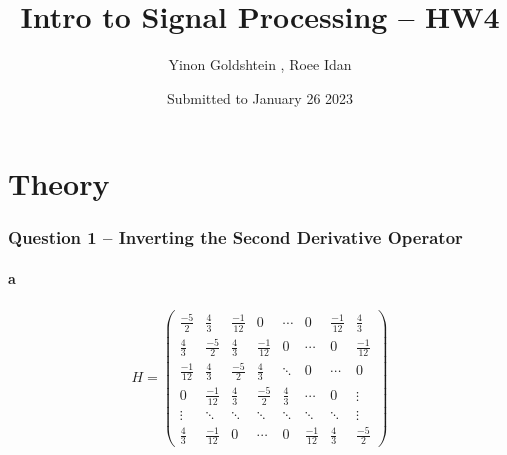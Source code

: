 \documentclass[a4paper]{article}
\begin{document}
\title{Intro to Signal Processing -- HW4}
\author{Yinon Goldshtein , Roee Idan}
\date{Submitted to January 26 2023}
\maketitle

\part{Theory}

\section*{Question 1 -- Inverting the Second Derivative Operator}



\subsection*{a}
\begin{align}
        H = \begin{pmatrix} \frac{-5}{2} & \frac{4}{3} & \frac{-1}{12} & 0 &\cdots & 0 & \frac{-1}{12} & \frac{4}{3}\\ \frac{4}{3} & \frac{-5}{2} & \frac{4}{3} & \frac{-1}{12}& 0 & \cdots & 0 & \frac{-1}{12} \\ \frac{-1}{12} & \frac{4}{3} & \frac{-5}{2} & \frac{4}{3} & \ddots & 0 & \cdots & 0 \\ 0 & \frac{-1}{12} & \frac{4}{3} & \frac{-5}{2} & \frac{4}{3} & \cdots & 0 & \vdots \\ \vdots & \ddots & \ddots & \ddots &\ddots & \ddots & \ddots & \vdots \\ \frac{4}{3} & \frac{-1}{12} & 0 & \cdots & 0 & \frac{-1}{12} & \frac{4}{3} & \frac{-5}{2}
    \end{pmatrix}
\end{align}
\end{document}
